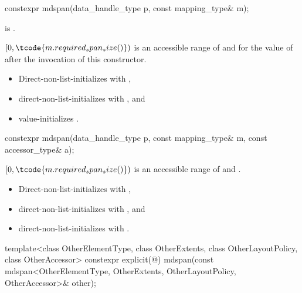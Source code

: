 %
\begin{itemdecl}
constexpr mdspan(data_handle_type p, const mapping_type& m);
\end{itemdecl}

\begin{itemdescr}
\pnum
\constraints
{} is .

\pnum
\expects
$[0, \tcode{m.required_span_size()})$ is
an accessible range of  and 
for the value of  after the invocation of this constructor.

\pnum
\effects
\begin{itemize}
\item
Direct-non-list-initializes  with ,
\item
direct-non-list-initializes  with , and
\item
value-initializes .
\end{itemize}
\end{itemdescr}

%
\begin{itemdecl}
constexpr mdspan(data_handle_type p, const mapping_type& m, const accessor_type& a);
\end{itemdecl}

\begin{itemdescr}
\pnum
\expects
$[0, \tcode{m.required_span_size()})$ is
an accessible range of  and .

\pnum
\effects
\begin{itemize}
\item
Direct-non-list-initializes  with ,
\item
direct-non-list-initializes  with , and
\item
direct-non-list-initializes  with .
\end{itemize}
\end{itemdescr}

%
\begin{itemdecl}
template<class OtherElementType, class OtherExtents,
         class OtherLayoutPolicy, class OtherAccessor>
  constexpr explicit(@\seebelow@)
    mdspan(const mdspan<OtherElementType, OtherExtents,
                        OtherLayoutPolicy, OtherAccessor>& other);
\end{itemdecl}


